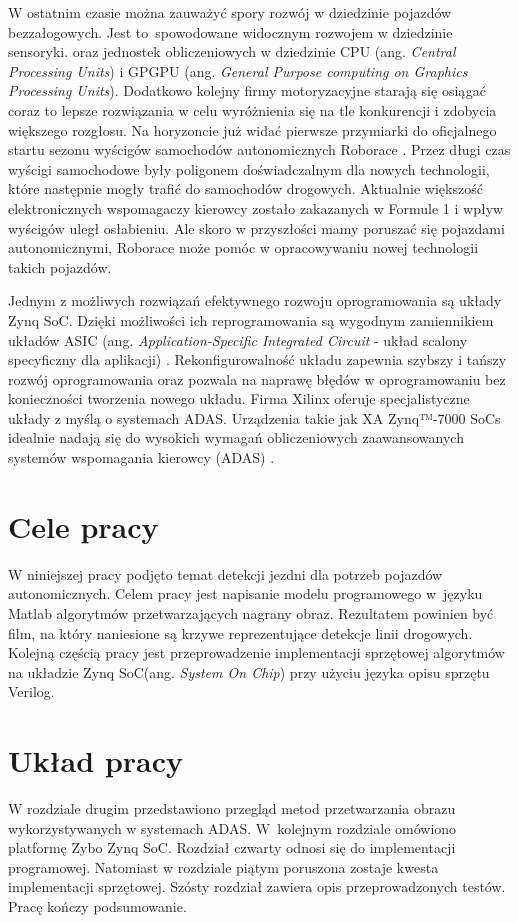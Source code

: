 
W ostatnim czasie można zauważyć spory rozwój w dziedzinie pojazdów bezzałogowych. Jest to~spowodowane widocznym rozwojem w dziedzinie sensoryki. oraz jednostek obliczeniowych w dziedzinie CPU (ang. \textit{Central Processing Units}) i GPGPU (ang. \textit{General Purpose computing on Graphics Processing Units}). Dodatkowo kolejny firmy motoryzacyjne starają się osiągać coraz to lepsze rozwiązania w celu wyróżnienia się na tle konkurencji i zdobycia większego rozgłosu. Na horyzoncie już widać pierwsze przymiarki do oficjalnego startu sezonu wyścigów samochodów autonomicznych Roborace \cite{roborace}. Przez długi czas wyścigi samochodowe były poligonem doświadczalnym dla nowych technologii, które następnie mogły trafić do samochodów drogowych. Aktualnie większość elektronicznych wspomagaczy kierowcy zostało zakazanych w Formule 1 i wpływ wyścigów uległ osłabieniu. Ale skoro w przyszłości mamy poruszać się pojazdami autonomicznymi, Roborace może pomóc w opracowywaniu nowej technologii takich pojazdów.

Jednym z możliwych rozwiązań efektywnego rozwoju oprogramowania są układy Zynq SoC. Dzięki możliwości ich reprogramowania są wygodnym zamiennikiem układów ASIC (ang. \textit{Application-Specific Integrated Circuit} - układ scalony specyficzny dla aplikacji) \cite{ASIC_zynq}. Rekonfigurowalność układu zapewnia szybszy i tańszy rozwój oprogramowania oraz pozwala na naprawę błędów w oprogramowaniu bez konieczności tworzenia nowego układu.
Firma Xilinx oferuje specjalistyczne układy z myślą o systemach ADAS. Urządzenia takie jak XA Zynq™-7000 SoCs idealnie nadają się do wysokich wymagań obliczeniowych zaawansowanych systemów wspomagania kierowcy (ADAS) \cite{xilinx}.


\section{Cele pracy}
W niniejszej pracy podjęto temat detekcji jezdni dla potrzeb pojazdów autonomicznych.  
Celem pracy jest napisanie modelu programowego w~języku Matlab algorytmów przetwarzających nagrany obraz. 
Rezultatem powinien być film, na który naniesione są krzywe reprezentujące detekcje linii drogowych.
Kolejną częścią pracy jest przeprowadzenie implementacji sprzętowej algorytmów na układzie Zynq SoC(ang. \textit{System On Chip}) przy użyciu języka opisu sprzętu Verilog. 
\section{Układ pracy}
W rozdziale drugim przedstawiono przegląd metod przetwarzania obrazu wykorzystywanych w systemach ADAS. 
W~kolejnym rozdziale omówiono platformę Zybo Zynq SoC. 
Rozdział czwarty odnosi się do implementacji programowej. Natomiast w rozdziale piątym poruszona zostaje kwesta implementacji sprzętowej. Szósty rozdział zawiera opis przeprowadzonych testów. Pracę kończy podsumowanie.